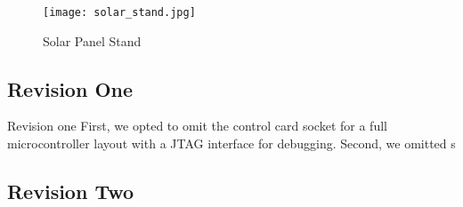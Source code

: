\begin{figure}
\centering
\texttt{[image: solar\_stand.jpg]}
\caption{Solar Panel Stand}
\label{solar stand}
\end{figure}

\subsection{Revision One}
Revision one 
First, we opted to omit the control card socket for a full microcontroller layout with a JTAG interface for debugging. Second, we omitted s

\subsection{Revision Two}


